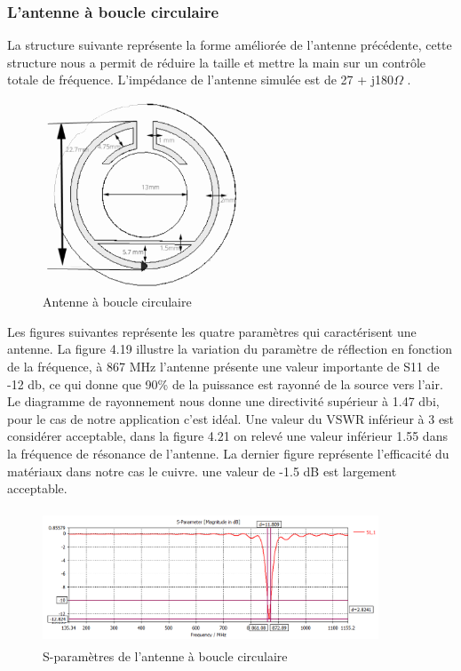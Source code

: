 \documentclass[11pt, a4paper, twoside]{book}
\begin{document}
\subsubsection{L'antenne à boucle circulaire}
La structure suivante représente la forme améliorée de l'antenne précédente, cette structure nous a permit de réduire la taille et mettre la main sur un contrôle totale de fréquence. L'impédance de l'antenne simulée est  de 27 + j180\(\Omega\)
.
\begin{figure}[H]
\centering
\includegraphics[width=6cm]{1STee}
\caption{Antenne à boucle circulaire}
\end{figure}

Les figures suivantes représente les quatre paramètres qui caractérisent une antenne. La figure 4.19 illustre
la variation du paramètre de réflection en fonction de la fréquence, à 867 MHz l'antenne présente une valeur importante de S11 de -12 db, ce qui donne que 90\% de la puissance est rayonné de la source vers l'air. Le diagramme de rayonnement  nous donne une directivité supérieur à 1.47 dbi, pour le cas de notre application c'est idéal. Une valeur du VSWR inférieur à 3 est  considérer acceptable, dans la figure 4.21  on relevé une valeur inférieur 1.55 dans la fréquence de résonance  de l'antenne. La dernier figure représente l'efficacité du matériaux dans notre cas le cuivre. une valeur de -1.5 dB est largement acceptable.

\begin{figure}[H]
\centering
\includegraphics[width=10cm,height=4cm]{claaaass11}
\caption{S-paramètres de l'antenne à  boucle circulaire}
\end{figure} 
\end{document}
